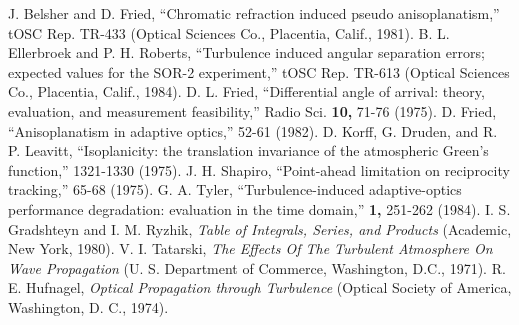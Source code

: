 \begin{references}
  J. Belsher and D. Fried, ``Chromatic refraction
induced pseudo  anisoplanatism,'' tOSC Rep. TR-433 (Optical
Sciences Co.,  Placentia, Calif., 1981).
  B. L. Ellerbroek and P. H. Roberts,  ``Turbulence
induced angular separation errors; expected values for the  SOR-2
experiment,'' tOSC Rep.  TR-613 (Optical Sciences Co.,  Placentia,
Calif., 1984).
  D. L. Fried, ``Differential angle of  arrival: theory,
evaluation, and measurement feasibility,'' Radio  Sci. {\bf 10,}
71-76 (1975).
  D. Fried, ``Anisoplanatism in adaptive  optics,''
 52-61 (1982).    D. Korff, G. Druden,
and  R. P. Leavitt, ``Isoplanicity: the translation invariance of
the  atmospheric Green's function,''  1321-1330
(1975).
   J. H. Shapiro, ``Point-ahead limitation on
reciprocity tracking,''   65-68 (1975).
  G. A. Tyler, ``Turbulence-induced  adaptive-optics
performance degradation: evaluation in the time domain,''  \josaa
{\bf  1,} 251-262 (1984).
  I. S. Gradshteyn and I. M.  Ryzhik, {\it Table of
Integrals, Series, and Products}  (Academic, New York, 1980).
  V. I. Tatarski, {\it The Effects Of The Turbulent
Atmosphere  On Wave Propagation} (U. S. Department of Commerce,
Washington, D.C., 1971).
  R. E.  Hufnagel, {\it Optical Propagation through
Turbulence} (Optical Society of America, Washington, D. C., 1974).
\end{references}

